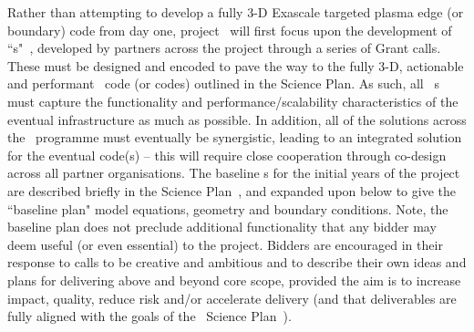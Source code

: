 Rather than attempting to develop a fully 3-D Exascale targeted plasma edge (or 
boundary) code from day one, project \nep \   will first focus upon the 
development of ``\papp s"~\cite{proxies}, developed by partners across 
the project through a series of Grant calls. These must be designed and encoded 
to pave the way to the fully 3-D, actionable and performant \nep \   code (or 
codes) outlined in the Science Plan. As such, all \nep \   \papp s must 
capture the functionality and performance/scalability characteristics of the 
eventual infrastructure as much as possible. In addition, all of the solutions 
across the \nep \   programme must eventually be synergistic, leading to an  
integrated solution for the eventual code(s) -- this will require close 
cooperation through co-design across all partner organisations. The baseline 
\papp s for the initial years of the project are described briefly in the 
Science Plan~\cite{sciplan}, and expanded upon below to give the
``baseline plan" model equations, geometry and boundary conditions.
Note, the baseline plan does not preclude additional 
functionality that any bidder may deem useful (or even essential) to the 
project. Bidders are encouraged in their response to calls to be creative 
and ambitious and to describe their own ideas and plans for delivering above 
and beyond core scope,  provided the aim is 
to increase impact, quality, reduce risk and/or accelerate delivery (and that 
deliverables are fully aligned with the goals of the \nep \   Science Plan~\cite{sciplan}).


